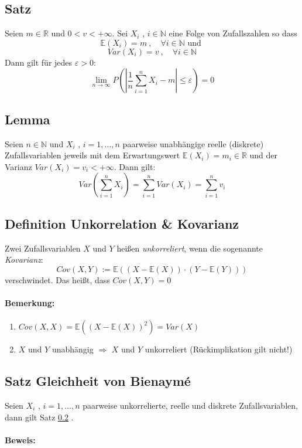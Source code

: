 \documentclass[12pt,a4paper]{article}
\begin{document}
	\subsection{Satz}
	Seien $m\in\mathbb{R}$ und $0<v<+\infty$. Sei $X_i$ , $i\in\mathbb{N}$ eine Folge von Zufallszahlen so dass
	$$\mathbb{E}(X_i)=m\: ,\quad \forall i\in\mathbb{N} \text{ und }$$
	$$Var(X_i)=v\: , \quad \forall i \in\mathbb{N}$$
	Dann gilt für jedes $\varepsilon>0$:
	$$\lim_{n\rightarrow\infty} P\left(\left|\frac{1}{n}\sum_{i=1}^n X_i - m\right|\leq\varepsilon\right)=0$$
	
	\subsection{Lemma}
	\label{lemma9.5}
	Seien $n\in\mathbb{N}$ und $X_i$ , $i=1,...,n$ paarweise unabhängige reelle (diskrete) Zufallsvariablen jeweils mit dem Erwartungswert $\mathbb{E}(X_i)=m_i\in\mathbb{R}$ und der Varianz $Var(X_i)=v_i<+\infty$. Dann gilt:
	$$Var\left(\sum_{i=1}^n X_i\right) = \sum_{i=1}^n Var(X_i) = \sum_{i=1}^n v_i$$
	
	\subsection{Definition Unkorrelation \& Kovarianz}
	Zwei Zufallsvariablen $X$ und $Y$ heißen \textit{unkorreliert}, wenn die sogenannte  \textit{Kovarianz}:
	$$Cov(X,Y):=\mathbb{E}\left(\left(X-\mathbb{E}\left(X\right)\right)\cdot \left(Y-\mathbb{E}\left(Y\right)\right)\right)$$
	verschwindet. Das heißt, dass $Cov(X,Y)=0$
	\paragraph{Bemerkung:}
	\begin{enumerate}
		\item $Cov(X,X)=\mathbb{E}((X-\mathbb{E}(X))^2) = Var(X)$
		\item $X$ und $Y$ unabhängig $\Rightarrow$ $X$ und $Y$ unkorreliert (Rückimplikation gilt nicht!)
	\end{enumerate}
	
	\subsection{Satz Gleichheit von Bienaymé}
	Seien $X_i$ , $i=1,...,n$ paarweise unkorrelierte, reelle und diskrete Zufallsvariablen, dann gilt Satz \ref{lemma9.5} .
	\paragraph{Beweis:}
	
\end{document}
